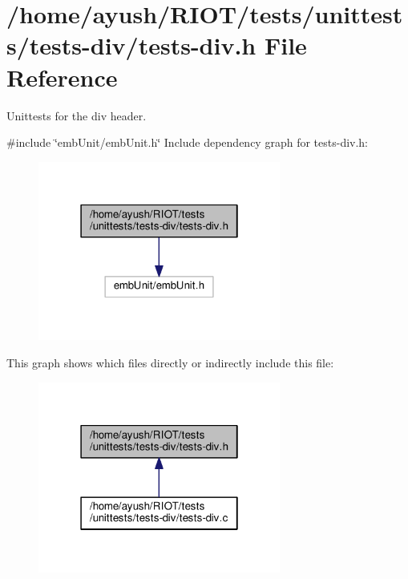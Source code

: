 \hypertarget{tests-div_8h}{}\section{/home/ayush/\+R\+I\+O\+T/tests/unittests/tests-\/div/tests-\/div.h File Reference}
\label{tests-div_8h}


Unittests for the {\ttfamily div} header.  


{\ttfamily \#include \char`\"{}emb\+Unit/emb\+Unit.\+h\char`\"{}}\newline
Include dependency graph for tests-\/div.h\+:
\nopagebreak
\begin{figure}[H]
\begin{center}
\leavevmode
\includegraphics[width=226pt]{tests-div_8h__incl}
\end{center}
\end{figure}
This graph shows which files directly or indirectly include this file\+:
\nopagebreak
\begin{figure}[H]
\begin{center}
\leavevmode
\includegraphics[width=226pt]{tests-div_8h__dep__incl}
\end{center}
\end{figure}
